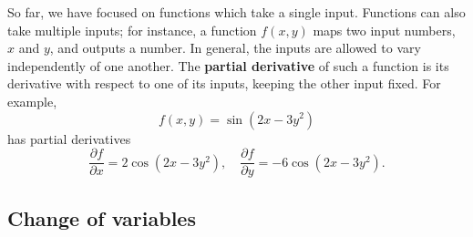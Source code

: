\documentclass[10pt,a4paper]{article}
\begin{document}
So far, we have focused on functions which take a single input.
Functions can also take multiple inputs; for instance, a function
$f(x,y)$ maps two input numbers, $x$ and $y$, and outputs a
number. In general, the inputs are allowed to vary independently of one
another. The \textbf{partial derivative} of such a function is its
derivative with respect to one of its inputs, keeping the other input
fixed. For example,
\begin{equation}
  f(x,y) = \sin(2x - 3 y^2)
\end{equation}
has partial derivatives
\begin{equation}
\frac{\partial f}{\partial x} = 2\cos(2x-3y^2), \quad \frac{\partial f}{\partial y} = - 6\cos(2x-3y^2).
\end{equation}

\subsection{Change of variables}
\label{change-of-variables}
\end{document}
